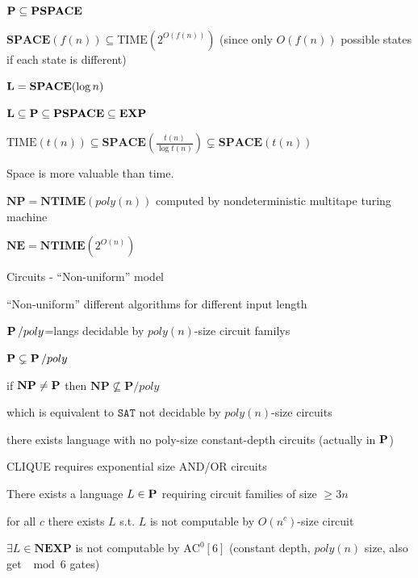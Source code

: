 \documentclass[11pt]{article}
\def \TIME {\text{TIME}}
\def \EXP {\textbf{EXP}}
\def \SPACE {\textbf{SPACE}}
\def \PSPACE {\textbf{PSPACE}}
\def \NTIME {\textbf{NTIME}}
\def \NP {\textbf{NP}}
\def \NEXP {\textbf{NEXP}}
\def \NE {\textbf{NE}}
\def \Pspoly {\textbf{P}/poly}
\def \AC {\text{AC}}
\def \NP {\textbf{NP}}
\def \SAT {\texttt{SAT}}
\begin{document}
\(\bP\subseteq\PSPACE\)

\(\SPACE(f(n))\subseteq\TIME(2^{O(f(n))})\) (since only \(O(f(n))\) possible states if each state
is different)

\(\bL=\SPACE(\log n)\)

\(\bL\subseteq\bP\subseteq\PSPACE\subseteq\EXP\)

\begin{theorem}[HPV77]
\(\TIME(t(n))\subseteq\SPACE(\frac{t(n)}{\log t(n)})\subsetneq\SPACE(t(n))\)
\end{theorem}

Space is more valuable than time.

\(\NP=\NTIME(poly(n))\) computed by nondeterministic multitape turing machine

\(\NE=\NTIME(2^{O(n)})\)

Circuits - ``Non-uniform'' model

``Non-uniform'' different algorithms for different input length

\(\operatorname{\textbf{P}}/poly\)=langs decidable by \(poly(n)\)-size circuit familys

\(\operatorname{\textbf{P}}\subsetneq\operatorname{\textbf{P}}/poly\)

if \(\NP\neq\bP\) then \(\NP\not\subseteq\Pspoly\)

which is equivalent to \(\SAT\) not decidable by \(poly(n)\)-size circuits

\begin{theorem}[]
there exists language with no poly-size constant-depth circuits (actually in \(\operatorname{\textbf{P}}\))
\end{theorem}

\begin{theorem}[]
CLIQUE requires exponential size AND/OR circuits
\end{theorem}

\begin{theorem}[]
There exists a language \(L\in\operatorname{\textbf{P}}\) requiring circuit families of size \(\ge3 n\)
\end{theorem}


\begin{theorem}
for all \(c\) there exists \(L\) s.t. \(L\) is not computable by \(O(n^c)\)-size circuit
\end{theorem}

\begin{theorem}
\(\exists L\in\NEXP\) is not computable by \(\AC^0[6]\) (constant depth, \(poly(n)\) size, also
get \(\mod6\) gates)
\end{theorem}
\end{document}
